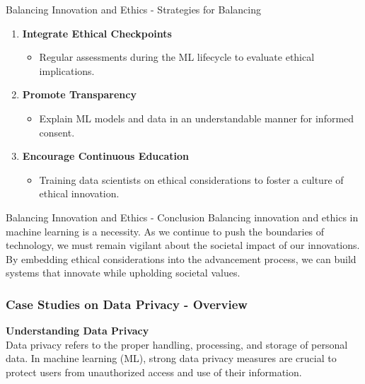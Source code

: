 \documentclass[aspectratio=169]{beamer}
\begin{document}
\begin{frame}[fragile]{Balancing Innovation and Ethics - Strategies for Balancing}
    \begin{enumerate}
        \item \textbf{Integrate Ethical Checkpoints}
        \begin{itemize}
            \item Regular assessments during the ML lifecycle to evaluate ethical implications.
        \end{itemize}
        
        \item \textbf{Promote Transparency}
        \begin{itemize}
            \item Explain ML models and data in an understandable manner for informed consent.
        \end{itemize}
        
        \item \textbf{Encourage Continuous Education}
        \begin{itemize}
            \item Training data scientists on ethical considerations to foster a culture of ethical innovation.
        \end{itemize}
    \end{enumerate}
\end{frame}

\begin{frame}[fragile]{Balancing Innovation and Ethics - Conclusion}
    Balancing innovation and ethics in machine learning is a necessity. 
    As we continue to push the boundaries of technology, we must remain vigilant about the societal impact of our innovations. 
    By embedding ethical considerations into the advancement process, we can build systems that innovate while upholding societal values.
\end{frame}

\begin{frame}[fragile]
    \frametitle{Case Studies on Data Privacy - Overview}
    \textbf{Understanding Data Privacy} \\
    Data privacy refers to the proper handling, processing, and storage of personal data. In machine learning (ML), strong data privacy measures are crucial to protect users from unauthorized access and use of their information.
\end{frame}
\end{document}
